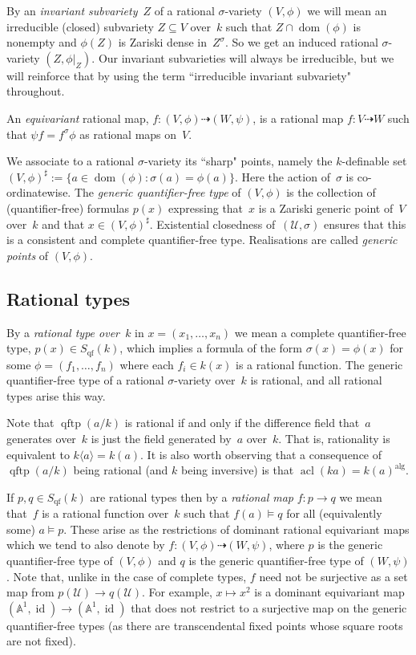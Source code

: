 \documentclass[\DocOpts]{amsart}
\theoremstyle{definition}
\def\qftp{\operatorname{qftp}}
\def\qf{\operatorname{qf}}
\def\acl{\operatorname{acl}}
\def\alg{{\operatorname{alg}}}
\def\U{\mathcal{U}}
\renewcommand{\AA}{\mathbb{A}}
\providecommand{\id}{\operatorname{id}}
\newcommand{\dom}[1]{{\operatorname{dom} (#1)}}
\newcommand{\<}{\langle}
\renewcommand{\>}{\rangle}
\newcommand{\dto}{\dashrightarrow}
\begin{document}
By an {\em invariant subvariety}~$Z$ of a rational $\sigma$-variety $(V,\phi)$ we will mean an irreducible (closed) subvariety $Z\subseteq V$ over~$k$ such that $Z\cap\dom{\phi}$ is nonempty and $\phi(Z)$ is Zariski dense in~$Z^\sigma$.
So we get an induced rational $\sigma$-variety $(Z,\phi|_Z)$.
Our invariant subvarieties will always be irreducible, but we will reinforce that by using the term ``irreducible invariant subvariety" throughout.

An {\em equivariant} rational map, $f:(V,\phi)\dto(W,\psi)$, is a rational map $f:V\dto W$ such that $\psi f=f^\sigma\phi$ as rational maps on~$V$.

We associate to a rational $\sigma$-variety its ``sharp" points, namely the $k$-definable set $(V,\phi)^\sharp:=\{a\in \dom{\phi}:\sigma(a)=\phi(a)\}$.
Here the action of~$\sigma$ is co-ordinatewise.
The {\em generic quantifier-free type} of $(V,\phi)$ is the collection of (quantifier-free) formulas $p(x)$ expressing that~$x$ is a Zariski generic point of~$V$ over~$k$ and that $x\in(V,\phi)^\sharp$.
Existential closedness of~$(\U,\sigma)$ ensures that this is a consistent and complete quantifier-free type.
Realisations are called {\em generic points} of $(V,\phi)$.

\medskip
\subsection{Rational types}\label{subsect:rt}
By a \emph{rational type over~$k$} in $x=(x_1,\dots,x_n)$ we mean a complete quantifier-free type, 
$p(x)\in S_{\qf}(k)$, which implies a formula of the form $\sigma(x)=\phi(x)$ 
for some $\phi=(f_1,\dots,f_n)$ where each $f_i\in  k(x)$ is a rational function.
The generic quantifier-free type of a rational $\sigma$-variety over~$k$ is rational, and all rational types arise this way.

Note that $\qftp(a/k)$ is rational if and only if the difference field that~$a$ generates over~$k$ is just the field generated by~$a$ over~$k$.
That is, rationality is equivalent to $k\langle a\rangle=k(a)$.
It is also worth observing that a consequence of $\qftp(a/k)$ being rational (and $k$ being inversive) is that $\acl(ka)=k(a)^{\alg}$.

If $p,q\in S_{\qf}(k)$ are rational types then by a \emph{rational map} $f:p\to q$ we mean that~$f$ is a rational function over~$k$ such that $f(a)\models q$ for all (equivalently some) $a\models p$.
These arise as the restrictions of dominant rational equivariant maps which we tend to also denote by $f:(V,\phi)\dto(W,\psi)$, where $p$ is the generic quantifier-free type of $(V,\phi)$ and $q$ is the generic quantifier-free type of $(W,\psi)$.
Note that, unlike in the case of complete types, $f$ need not
be surjective as a set map from $p(\U)\to q(\U)$.
For example, $x\mapsto x^2$ is a dominant equivariant map $(\AA^1,\id)\to(\AA^1,
\id)$ that does not restrict to a surjective map on the generic quantifier-free types (as there are transcendental fixed points whose square roots are not fixed).
\end{document}
